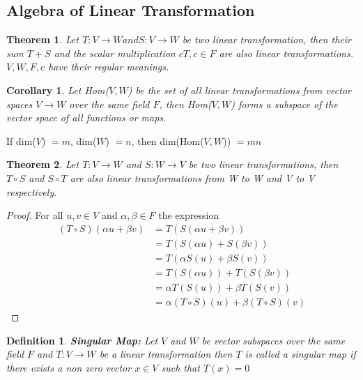 \documentclass[a4paper, titlepage]{article}
\newtheorem{theorem}{Theorem}[section]
\newtheorem{definition}{Definition}[section]
\newtheorem{corollary}{Corollary}[theorem]
\begin{document}
    \subsection{Algebra of Linear Transformation}
        \begin{theorem}
            Let $T: V \rightarrow W and S: V \rightarrow W$ be two linear
            transformation, then their sum $T + S$ and the scalar multiplication
            $cT, c \in F$ are also linear transformations. $V, W, F, c$ have 
            their regular meanings.
        \end{theorem}
        \begin{corollary}
            Let \textup{Hom($V, W$)} be the set of all linear transformations from vector
            spaces $V \rightarrow W$ over the same field $F$, then \textup{Hom($V, W$)} forms
            a subspace of the vector space of all functions or maps.
        \end{corollary}
        If dim($V$) $= m$, dim($W$) $= n$, then dim(Hom($V, W$)) $= mn$
        \begin{theorem}
            Let $T: V \rightarrow W$ and $S: W \rightarrow V$ be two linear
            transformations, then $T \circ S$ and $S \circ T$ are also linear
            transformations from W to W and V to V respectively.
        \end{theorem}
        \begin{proof}
            For all $u, v \in V$ and $\alpha, \beta \in F$ the expression
            \begin{align*}
                (T \circ S)(\alpha u + \beta v) &= T(S(\alpha u + \beta v)) \\
                                                &= T(S(\alpha u) + S(\beta v)) \\
                                                &= T(\alpha S(u) + \beta S(v)) \\
                                                &= T(S(\alpha u)) + T(S(\beta v)) \\
                                                &= \alpha T(S(u)) + \beta T(S(v)) \\
                                                &= \alpha (T \circ S)(u) + \beta (T \circ S)(v)
            \end{align*}
        \end{proof}

        \begin{definition}
            \textbf{Singular Map: }Let $V$ and $W$ be vector subspaces
            over the same field $F$ and $T: V \to W$ be a linear 
            transformation then $T$ is called a singular map if there
            exists a non zero vector $x \in V$ such that $T(x) = 0$
        \end{definition}
\end{document}
